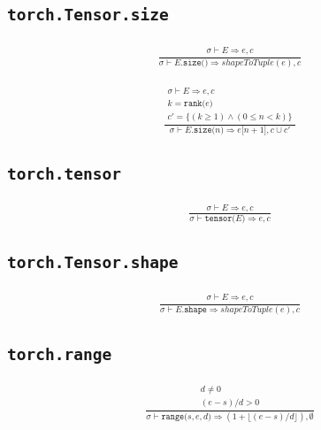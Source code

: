 \documentclass{article}
\newcommand{\Rar}{\Rightarrow}
\newcommand{\mtt}[1]{\mathtt{#1}}
\newcommand{\op}[2]{\mtt{#1(}#2\mtt{)}}
\newcommand{\ind}[1]{\mtt{[}#1\mtt{]}}
\begin{document}
\subsection*{\texttt{torch.Tensor.size}}%
\begin{align*}
  \frac
  {
    \begin{array}{l}
      \sigma \vdash E \Rar e, c
    \end{array}
  }
  {
    \sigma \vdash E.\op{size}{} \Rar shapeToTuple(e), c
  }
\end{align*}

\begin{align*}
  \frac
  {
    \begin{array}{l}
      \sigma \vdash E \Rar e, c \\
      k = \op{rank}{e} \\
      c' = \{ (k \geq 1) \land (0 \leq n < k) \}
    \end{array}
  }
  {
    \sigma \vdash E.\op{size}{n} \Rar e\ind{n+1}, c \cup c'
  }
\end{align*}%

\subsection*{\texttt{torch.tensor}}%
\begin{align*}
  \frac
  {
    \sigma \vdash {E} \Rar e, c
  }
  {
    \sigma \vdash \op{tensor}{E} \Rar e, c
  }
\end{align*}%

\subsection*{\texttt{torch.Tensor.shape}}%
\begin{align*}
  \frac
  {
    \begin{array}{l}
      \sigma \vdash E \Rar e, c
    \end{array}
  }
  {
    \sigma \vdash E.\mtt{shape} \Rar shapeToTuple(e), c
  }
\end{align*}%

\subsection*{\texttt{torch.range}}%
\begin{align*}
  \frac
  {
    \begin{array}{l}
      d \neq 0\\
      (e-s)/d > 0
    \end{array}
  }
  {
    \sigma \vdash \op{range}{s, e, d} \Rar (1+\lfloor (e-s)/d \rfloor), \emptyset
  }
  \tag*{Default: $s = 0, d = 1$}
\end{align*}%
\end{document}
